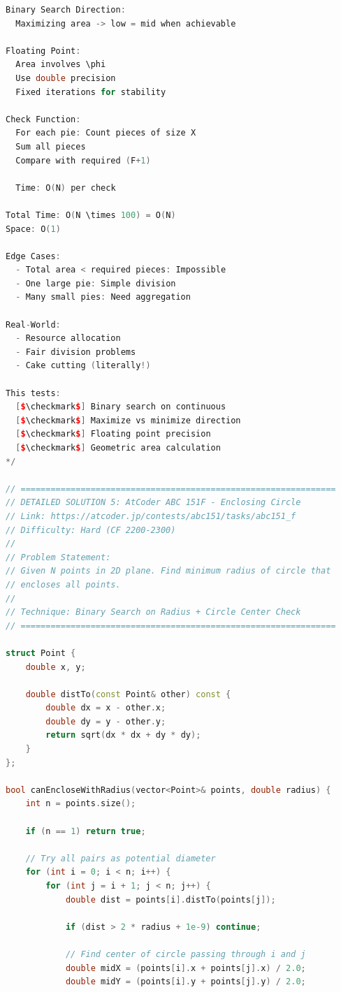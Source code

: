 \documentclass[11pt,a4paper,oneside]{book}
\begin{document}
\begin{lstlisting}[language=C++, caption=Circle and Area Solutions - DETAILED]
Binary Search Direction:
  Maximizing area -> low = mid when achievable

Floating Point:
  Area involves \phi
  Use double precision
  Fixed iterations for stability

Check Function:
  For each pie: Count pieces of size X
  Sum all pieces
  Compare with required (F+1)
  
  Time: O(N) per check

Total Time: O(N \times 100) = O(N)
Space: O(1)

Edge Cases:
  - Total area < required pieces: Impossible
  - One large pie: Simple division
  - Many small pies: Need aggregation

Real-World:
  - Resource allocation
  - Fair division problems
  - Cake cutting (literally!)

This tests:
  [$\checkmark$] Binary search on continuous
  [$\checkmark$] Maximize vs minimize direction
  [$\checkmark$] Floating point precision
  [$\checkmark$] Geometric area calculation
*/

// ===============================================================
// DETAILED SOLUTION 5: AtCoder ABC 151F - Enclosing Circle
// Link: https://atcoder.jp/contests/abc151/tasks/abc151_f
// Difficulty: Hard (CF 2200-2300)
//
// Problem Statement:
// Given N points in 2D plane. Find minimum radius of circle that
// encloses all points.
//
// Technique: Binary Search on Radius + Circle Center Check
// ===============================================================

struct Point {
    double x, y;
    
    double distTo(const Point& other) const {
        double dx = x - other.x;
        double dy = y - other.y;
        return sqrt(dx * dx + dy * dy);
    }
};

bool canEncloseWithRadius(vector<Point>& points, double radius) {
    int n = points.size();
    
    if (n == 1) return true;
    
    // Try all pairs as potential diameter
    for (int i = 0; i < n; i++) {
        for (int j = i + 1; j < n; j++) {
            double dist = points[i].distTo(points[j]);
            
            if (dist > 2 * radius + 1e-9) continue;
            
            // Find center of circle passing through i and j
            double midX = (points[i].x + points[j].x) / 2.0;
            double midY = (points[i].y + points[j].y) / 2.0;
            

\end{lstlisting}
\end{document}
